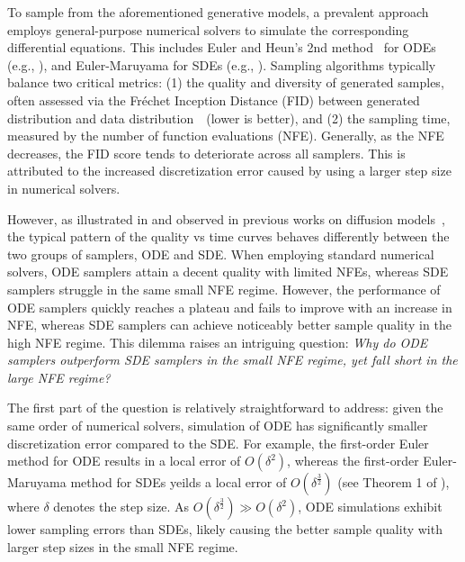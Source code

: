 
To sample from the aforementioned generative models, a prevalent approach employs general-purpose numerical solvers to simulate the corresponding differential equations. This includes Euler and Heun's 2nd method~\cite{Ascher1998ComputerMF} for ODEs (e.g., ), and Euler-Maruyama for SDEs (e.g., ). Sampling algorithms typically balance two critical metrics: (1) the quality and diversity of generated samples, often assessed via the Fréchet Inception Distance (FID) between generated distribution and data distribution~\cite{Heusel2017GANsTB}~(lower is better), and (2) the sampling time, measured by the number of function evaluations (NFE). Generally, as the NFE decreases, the FID score tends to deteriorate across all samplers. This is attributed to the increased discretization error caused by using a larger step size in numerical solvers.

However, as illustrated in  and observed in previous works on diffusion models~\cite{Song2020ScoreBasedGM, Song2020DenoisingDI, Karras2022ElucidatingTD}, the typical pattern of the quality vs time curves behaves differently between the two groups of samplers, ODE and SDE. When employing standard numerical solvers, ODE samplers attain a decent quality with limited NFEs, whereas SDE samplers struggle in the same small NFE regime. However, the performance of ODE samplers quickly reaches a plateau and fails to improve with an increase in NFE, whereas SDE samplers can achieve noticeably better sample quality in the high NFE regime. This dilemma raises an intriguing question: \textit{Why do ODE samplers outperform SDE samplers in the small NFE regime, yet fall short in the large NFE regime?}

The first part of the question is relatively straightforward to address: given the same order of numerical solvers, simulation of ODE has significantly smaller discretization error compared to the SDE. For example, the first-order Euler method for ODE results in a local error of $O(\delta^2)$, whereas the first-order Euler-Maruyama method for SDEs yeilds a local error of $O(\delta^{\frac{3}{2}})$ (see \eg Theorem 1 of \cite{dalalyan2019user}), where $\delta$ denotes the step size. As $O(\delta^{\frac{3}{2}})\gg O(\delta^2)$, ODE simulations exhibit lower sampling errors than SDEs, likely causing the better sample quality with larger step sizes in the small NFE regime.

